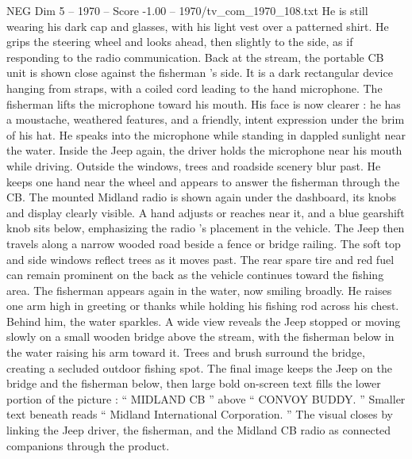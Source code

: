 \begin{textsample}{NEG Dim 5 – 1970 – Score -1.00 – 1970/tv\_com\_1970\_108.txt}
He is still wearing his dark cap and glasses, with his light vest over a patterned shirt.
He grips the steering wheel and looks ahead, then slightly to the side, as if responding to the radio communication.
Back at the stream, the portable CB unit is shown close against the fisherman ’s side.
It is a dark rectangular device hanging from straps, with a coiled cord leading to the hand microphone.
The fisherman lifts the microphone toward his mouth.
His face is now clearer : he has a moustache, weathered features, and a friendly, intent expression under the brim of his hat.
He speaks into the microphone while standing in dappled sunlight near the water.
Inside the Jeep again, the driver holds the microphone near his mouth while driving.
Outside the windows, trees and roadside scenery blur past.
He keeps one hand near the wheel and appears to answer the fisherman through the CB.
The mounted Midland radio is shown again under the dashboard, its knobs and display clearly visible.
A hand adjusts or reaches near it, and a blue gearshift knob sits below, emphasizing the radio ’s placement in the vehicle.
The Jeep then travels along a narrow wooded road beside a fence or bridge railing.
The soft top and side windows reflect trees as it moves past.
The rear spare tire and red fuel can remain prominent on the back as the vehicle continues toward the fishing area.
The fisherman appears again in the water, now smiling broadly.
He raises one arm high in greeting or thanks while holding his fishing rod across his chest.
Behind him, the water sparkles.
A wide view reveals the Jeep stopped or moving slowly on a small wooden bridge above the stream, with the fisherman below in the water raising his arm toward it.
Trees and brush surround the bridge, creating a secluded outdoor fishing spot.
The final image keeps the Jeep on the bridge and the fisherman below, then large bold on-screen text fills the lower portion of the picture : “ MIDLAND CB ” above “ CONVOY BUDDY. ” Smaller text beneath reads “ Midland International Corporation. ” The visual closes by linking the Jeep driver, the fisherman, and the Midland CB radio as connected companions through the product.

\end{textsample}
